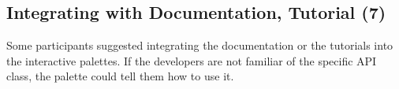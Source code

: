 \documentclass[conference]{IEEEtran}
\begin{document}
\subsection{Integrating with Documentation, Tutorial (7)}
Some participants suggested integrating the documentation or the tutorials into the interactive palettes. If the developers are not familiar of the specific API class, the palette could tell them how to use it.


















\end{document}
